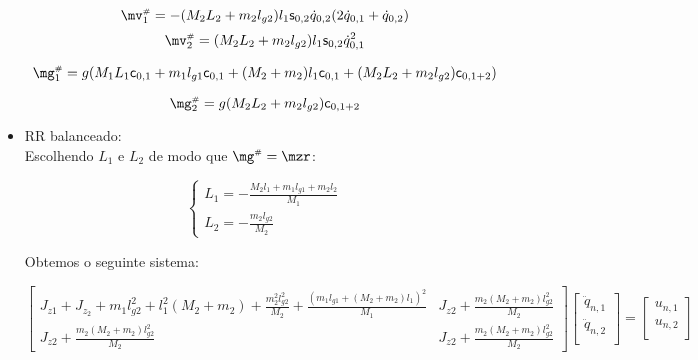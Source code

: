 \begin{itemize}
\begin{equation}
\mv\ssh_1 = - (M_2 L_2 + m_2 l_{g2}) l_1 \ssin_{0,2} \dot{q}_{0,2} (2 \dot{q}_{0,1} + \dot{q}_{0,2})  
\end{equation}
\begin{equation}
\mv\ssh_2 = (M_2 L_2 + m_2 l_{g2}) l_1 \ssin_{0,2} \dot{q}_{0,1}^2  
\end{equation}

\begin{equation}
\mg\ssh_1 = g( M_1 L_1 \ccos_{0,1} + m_1 l_{g1} \ccos_{0,1} + (M_2 + m_2) l_1 \ccos_{0,1} + (M_2 L_2 + m_2 l_{g2}) \ccos_{0,1+2} ) 
\end{equation}

\begin{equation}
\mg\ssh_2 = g( M_2 L_2 + m_2 l_{g2} ) \ccos_{0,1+2} 
\end{equation}

\item RR balanceado: \\

Escolhendo $L_1$ e $L_2$ de modo que $\mg\ssh = \mzr$:

\begin{equation}
\begin{cases}
L_1 = -\frac{ M_2 l_1 + m_1 l_{g1} + m_2 l_2 }{M_1} \\
L_2 = -\frac{ m_2 l_{g2} }{ M_2 }
\end{cases}
\end{equation}

Obtemos o seguinte sistema:

\begin{equation}
\begin{bmatrix}
J_{z	1} + J_{z_2} + m_1 l_{g2}^2 + l_1^2 (M_2 + m_2) + \frac{m_2^2 l_{g2}^2}{M_2} + \frac{(m_1 l_{g1} + (M_2 + m_2) l_1 )^2 }{M_1} & J_{z2} + \frac{ m_2 (M_2 + m_2) l_{g2}^2}{M_2} \\
J_{z2} + \frac{ m_2 (M_2 + m_2) l_{g2}^2}{M_2} & J_{z2} + \frac{ m_2 (M_2 + m_2) l_{g2}^2}{M_2}
\end{bmatrix}
\begin{bmatrix}
\ddot{q}_{n,1} \\
\ddot{q}_{n,2} \\
\end{bmatrix}
=
\begin{bmatrix}
u_{n,1} \\
u_{n,2} \\
\end{bmatrix}
\end{equation}

\end{itemize}